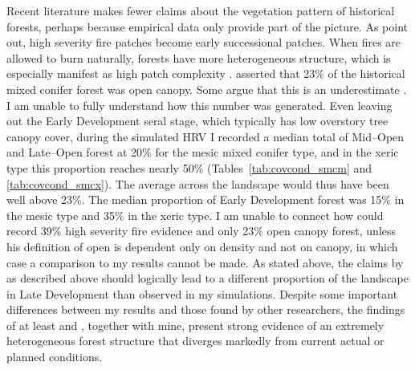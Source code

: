 Recent literature makes fewer claims about the vegetation pattern of historical forests, perhaps because empirical data only provide part of the picture. As \citet{Collins2010} point out, high severity fire patches become early successional patches. When fires are allowed to burn naturally, forests have more heterogeneous structure, which is especially manifest as high patch complexity \citep{Collins2010}. \citep{Baker2014} asserted that 23\% of the historical mixed conifer forest was open canopy. Some argue that this is an underestimate \citep{Fule2014}. I am unable to fully understand how this number was generated. Even leaving out the Early Development seral stage, which typically has low overstory tree canopy cover, during the simulated HRV I recorded a median total of Mid--Open and Late--Open forest at 20\% for the mesic mixed conifer type, and in the xeric type this proportion reaches nearly 50\% (Tables~\ref{tab:covcond_smcm} and \ref{tab:covcond_smcx}). The average across the landscape would thus have been well above 23\%. The median proportion of Early Development forest was 15\% in the mesic type and 35\% in the xeric type. I am unable to connect how \citet{Baker2014} could record 39\% high severity fire evidence and only 23\% open canopy forest, unless his definition of open is dependent only on density and not on canopy, in which case a comparison to my results cannot be made. As stated above, the claims by \citet{Mallek2013} as described above should logically lead to a different proportion of the landscape in Late Development than observed in my simulations. Despite some important differences between my results and those found by other researchers, the findings of at least \citet{Baker2012} and \citet{Collins2010}, together with mine, present strong evidence of an extremely heterogeneous forest structure that diverges markedly from current actual or planned conditions. 

